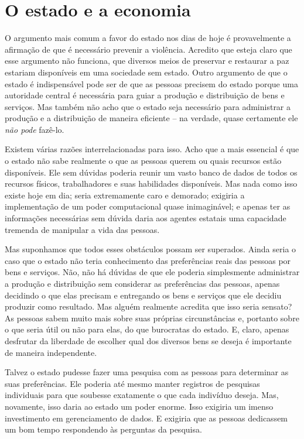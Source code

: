 \section{O estado e a economia}

O argumento mais comum a favor do estado nos dias de hoje é provavelmente a afirmação de que é necessário prevenir a violência. Acredito que esteja claro que esse argumento não funciona, que diversos meios de preservar e restaurar a paz estariam disponíveis em uma sociedade sem estado. Outro argumento de que o estado é indispensável pode ser de que as pessoas precisem do estado porque uma autoridade central é necessária para guiar a produção e distribuição de bens e serviços. Mas também não acho que o estado seja necessário para administrar a produção e a distribuição de maneira eficiente -- na verdade, quase certamente ele \emph{não pode} fazê-lo.

Existem várias razões interrelacionadas para isso. Acho que a mais essencial é que o estado não sabe realmente o que as pessoas querem ou quais recursos estão disponíveis. Ele sem dúvidas poderia reunir um vasto banco de dados de todos os recursos físicos, trabalhadores e suas habilidades disponíveis. Mas nada como isso existe hoje em dia; seria extremamente caro e demorado; exigiria a implementação de um poder computacional quase inimaginável; e apenas ter as informações necessárias sem dúvida daria aos agentes estatais uma capacidade tremenda de manipular a vida das pessoas.

Mas suponhamos que todos esses obstáculos possam ser superados. Ainda seria o caso que o estado não teria conhecimento das preferências reais das pessoas por bens e serviços. Não, não há dúvidas de que ele poderia simplesmente administrar a produção e distribuição sem considerar as preferências das pessoas, apenas decidindo o que elas precisam e entregando os bens e serviços que ele decidiu produzir como resultado. Mas alguém realmente acredita que isso seria sensato? As pessoas sabem muito mais sobre suas próprias circunstâncias e, portanto sobre o que seria útil ou não para elas, do que burocratas do estado. E, claro, apenas desfrutar da liberdade de escolher qual dos diversos bens se deseja é importante de maneira independente.

Talvez o estado pudesse fazer uma pesquisa com as pessoas para determinar as suas preferências. Ele poderia até mesmo manter registros de pesquisas individuais para que soubesse exatamente o que cada indivíduo deseja. Mas, novamente, isso daria ao estado um poder enorme. Isso exigiria um imenso investimento em gerenciamento de dados. E exigiria que as pessoas dedicassem um bom tempo respondendo às perguntas da pesquisa.

